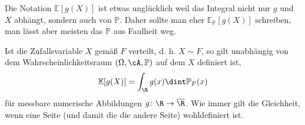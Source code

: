 \marginpar{\textcolor{red}{Vorlesung 15}}

\begin{bem1}
	Die Notation $\mathbb{E}[g(X)]$ ist etwas unglücklich weil das Integral nicht nur $g$ und $X$ abh\"angt, sondern auch von $\mathbb P$. Daher sollte man eher  $\mathbb{E}_{\mathbb{P}}[g(X)]$ schreiben, man l\"asst aber meisten das $\mathbb{P}$ aus Faulheit weg.
\end{bem1}

\begin{lemma}\label{ewTrafo}
	Ist die Zufallsvariable $X$ gem\"a\ss{} $F$ verteilt, d. h. $X\sim F$, so gilt unabhängig von dem Wahrscheinlichkeitsraum $(\Omega, \cA, \mathbb{P})$ auf dem $X$ definiert ist,
	\[ \mathbb{E}[g(X)] = \int_{\R} g(x) \dint \mathbb{P}_F(x) \]
	für messbare numerische Abbildungen $g \colon \R \to \overline{\R}$. Wie immer gilt die Gleichheit, wenn eine Seite (und damit die die andere Seite) wohldefiniert ist.
\end{lemma}

